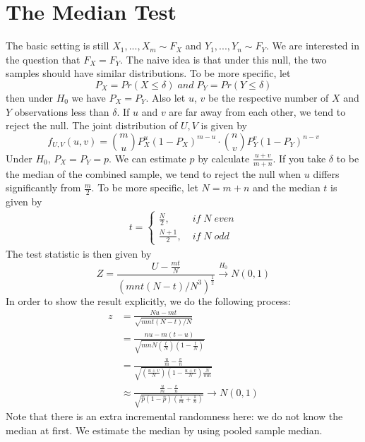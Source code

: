 \documentclass[twoside]{article}
\begin{document}
	\section{The Median Test}
	The basic setting is still $X_1, ..., X_m \sim F_X$ and $Y_1, ..., Y_n \sim F_Y$. We are interested in the question that $F_X = F_Y$. The naive idea is that under this null, the two samples should have similar distributions. To be more specific, let 
	$$
	P_X = Pr \left( X \leqslant \delta \right) \; and \; P_Y = Pr \left( Y \leqslant \delta \right)
	$$
	then under $H_0$ we have $P_X = P_Y$. Also let $u$, $v$ be the respective number of $X$ and $Y$ observations less than $\delta$. If $u$ and $v$ are far away from each other, we tend to reject the null. The joint distribution of $U, V$ is given by
	$$
	f_{U,V}(u,v) = \binom{m}{u} P_X^u \left( 1 - P_X \right)^{m-u} \cdot \binom{n}{v} P_Y^v \left( 1 - P_Y \right)^{n-v}
	$$
	Under $H_0$, $P_X = P_Y = p$. We can estimate $p$ by calculate $\frac{u+v}{m+n}$. If you take $\delta$ to be the median of the combined sample, we tend to reject the null when $u$ differs significantly from $\frac{m}{2}$. To be more specific, let $N=m+n$ and the median $t$ is given by
	\begin{align*}
		t = \begin{cases}
			\frac{N}{2}, \; &if \; N \; even \\
			\frac{N+1}{2}, \; &if \; N \; odd
		\end{cases}
	\end{align*}
	The test statistic is then given by
	$$
	Z = \frac{U - \frac{mt}{N}}{\left( mnt (N-t) / N^3 \right)^{\frac{1}{2}}} \xrightarrow{H_0} N(0,1)
	$$
	In order to show the result explicitly, we do the following process: 
	\begin{align*}
		z &= \frac{Nu - mt}{\sqrt{mnt(N-t)/N}} \\
		&= \frac{nu - m(t-u)}{\sqrt{mnN \left( \frac{t}{N} \right) \left( 1 - \frac{t}{N} \right)}} \\
		&= \frac{\frac{u}{m} - \frac{v}{n}}{\sqrt{\left( \frac{u+v}{N} \right) \left( 1 - \frac{u+v}{N} \right) \frac{N}{mn}}} \\
		&\approx \frac{\frac{u}{m} - \frac{v}{n}}{\sqrt{\hat{p} \left( 1 - \hat{p} \right) \left( \frac{1}{m} + \frac{1}{n} \right)}} \rightarrow N(0,1)
	\end{align*}
	Note that there is an extra incremental randomness here: we do not know the median at first. We estimate the median by using pooled sample median. 
	
\end{document}
